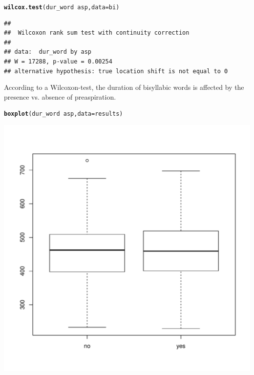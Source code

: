 \documentclass[a4paper,11pt]{article}\usepackage[]{graphicx}\usepackage[]{color}
\makeatletter
\def\maxwidth{ %
  \ifdim\Gin@nat@width>\linewidth
    \linewidth
  \else
    \Gin@nat@width
  \fi
}
\newcommand{\hlopt}[1]{\textcolor[rgb]{0,0,0}{#1}}%
\newcommand{\hlstd}[1]{\textcolor[rgb]{0.345,0.345,0.345}{#1}}%
\newcommand{\hlkwc}[1]{\textcolor[rgb]{0.333,0.667,0.333}{#1}}%
\newcommand{\hlkwd}[1]{\textcolor[rgb]{0.737,0.353,0.396}{\textbf{#1}}}%
\newenvironment{kframe}{%
 \def\at@end@of@kframe{}%
 \ifinner\ifhmode%
  \def\at@end@of@kframe{\end{minipage}}%
  \begin{minipage}{\columnwidth}%
 \fi\fi%
 \def\FrameCommand##1{\hskip\@totalleftmargin \hskip-\fboxsep
 \colorbox{shadecolor}{##1}\hskip-\fboxsep
     \hskip-\linewidth \hskip-\@totalleftmargin \hskip\columnwidth}%
 \MakeFramed {\advance\hsize-\width
   \@totalleftmargin\z@ \linewidth\hsize
   \@setminipage}}%
 {\par\unskip\endMakeFramed%
 \at@end@of@kframe}
\newenvironment{knitrout}{}{} %
\makeatother
\begin{document}
\begin{knitrout}
\color{fgcolor}\begin{kframe}
\begin{alltt}
\hlkwd{wilcox.test}\hlstd{(dur_word} \hlopt{~} \hlstd{asp,} \hlkwc{data} \hlstd{= bi)}
\end{alltt}
\begin{verbatim}
## 
## 	Wilcoxon rank sum test with continuity correction
## 
## data:  dur_word by asp
## W = 17288, p-value = 0.00254
## alternative hypothesis: true location shift is not equal to 0
\end{verbatim}
\end{kframe}
\end{knitrout}

According to a Wilcoxon-test, the duration of bisyllabic words is affected by the presence vs. absence of preaspiration.


\begin{knitrout}
\color{fgcolor}\begin{kframe}
\begin{alltt}
\hlkwd{boxplot}\hlstd{(dur_word} \hlopt{~} \hlstd{asp,} \hlkwc{data} \hlstd{= results)}
\end{alltt}
\end{kframe}
\includegraphics[width=\maxwidth]{img/results-box-1} 

\end{knitrout}
\end{document}
